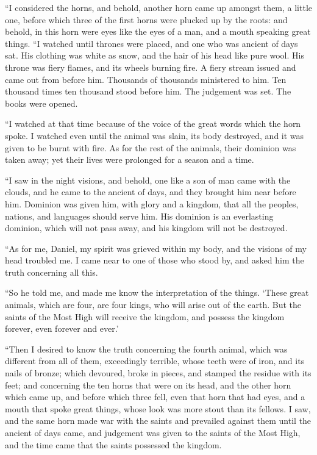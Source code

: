  ``I considered the horns, and behold, another horn came up
amongst them, a little one, before which three of the first horns were
plucked up by the roots: and behold, in this horn were eyes like the
eyes of a man, and a mouth speaking great things.  ``I
watched until thrones were placed, and one who was ancient of days sat.
His clothing was white as snow, and the hair of his head like pure wool.
His throne was fiery flames, and its wheels burning fire. 
A fiery stream issued and came out from before him. Thousands of
thousands ministered to him. Ten thousand times ten thousand stood
before him. The judgement was set. The books were opened.

 ``I watched at that time because of the voice of the great
words which the horn spoke. I watched even until the animal was slain,
its body destroyed, and it was given to be burnt with fire.
 As for the rest of the animals, their dominion was taken
away; yet their lives were prolonged for a season and a time.

 ``I saw in the night visions, and behold, one like a son
of man came with the clouds, and he came to the ancient of days, and
they brought him near before him.  Dominion was given him,
with glory and a kingdom, that all the peoples, nations, and languages
should serve him. His dominion is an everlasting dominion, which will
not pass away, and his kingdom will not be destroyed.

 ``As for me, Daniel, my spirit was grieved within my body,
and the visions of my head troubled me.  I came near to one
of those who stood by, and asked him the truth concerning all this.

``So he told me, and made me know the interpretation of the things.
 `These great animals, which are four, are four kings, who
will arise out of the earth.  But the saints of the Most
High will receive the kingdom, and possess the kingdom forever, even
forever and ever.'

 ``Then I desired to know the truth concerning the fourth
animal, which was different from all of them, exceedingly terrible,
whose teeth were of iron, and its nails of bronze; which devoured, broke
in pieces, and stamped the residue with its feet;  and
concerning the ten horns that were on its head, and the other horn which
came up, and before which three fell, even that horn that had eyes, and
a mouth that spoke great things, whose look was more stout than its
fellows.  I saw, and the same horn made war with the saints
and prevailed against them  until the ancient of days came,
and judgement was given to the saints of the Most High, and the time
came that the saints possessed the kingdom.

